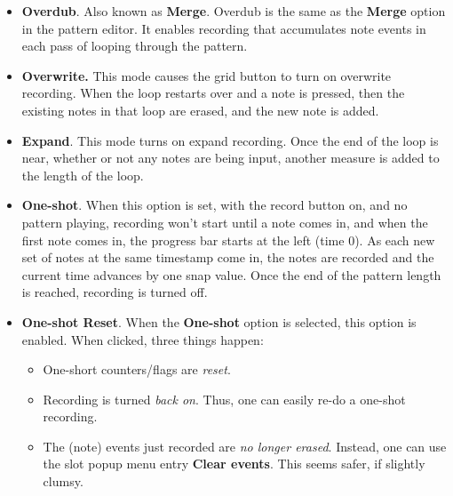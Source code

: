    \begin{itemize}
      \item \textbf{Overdub}.
         Also known as \textbf{Merge}.
         Overdub is the same as the \textbf{Merge} option in the 
         pattern editor.
         It enables recording that accumulates note events in each pass of
         looping through the pattern.
      \item \textbf{Overwrite.}
         This mode causes the grid button to turn on overwrite recording.
         When the loop restarts over and a note is pressed,
         then the existing notes in that loop are erased,
         and the new note is added.
      \item \textbf{Expand}.
         This mode turns on expand recording.
         Once the end of the loop is near, whether or
         not any notes are being input, another measure is added to the length
         of the loop.
      \item \textbf{One-shot}.
         When this option is set, with the record button on, and no pattern
         playing, recording won't start until a note comes in, and when the
         first note comes in, the progress bar starts at the left (time 0).
         As each new set of notes at the same timestamp come in, the
         notes are recorded and the current time advances by one snap value.
         Once the end of the pattern length is reached, recording is turned
         off.
      \item \textbf{One-shot Reset}.
         When the \textbf{One-shot} option is selected, this option
         is enabled.
         When clicked, three things happen:
         \begin{itemize}
            \item One-short counters/flags are \textsl{reset}.
            \item Recording is turned \textsl{back on}.
               Thus, one can easily re-do a one-shot recording.
            \item The (note) events just recorded are \textsl{no longer
            erased}. Instead, one can use the slot popup menu entry
            \textbf{Clear events}.
            This seems safer, if slightly clumsy.
         \end{itemize}
   \end{itemize}


